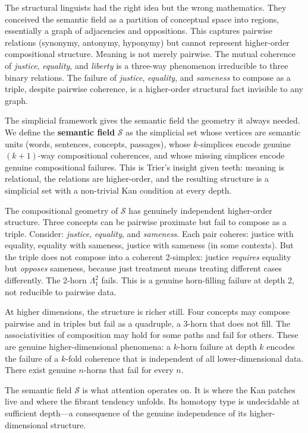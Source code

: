The structural linguists had the right idea but the wrong mathematics. They conceived the semantic field as a partition of conceptual space into regions, essentially a graph of adjacencies and oppositions. This captures pairwise relations (synonymy, antonymy, hyponymy) but cannot represent higher-order compositional structure. Meaning is not merely pairwise. The mutual coherence of \emph{justice}, \emph{equality}, and \emph{liberty} is a three-way phenomenon irreducible to three binary relations. The failure of \emph{justice}, \emph{equality}, and \emph{sameness} to compose as a triple, despite pairwise coherence, is a higher-order structural fact invisible to any graph.

The simplicial framework gives the semantic field the geometry it always needed. We define the \textbf{semantic field} $\mathcal{S}$ as the simplicial set whose vertices are semantic units (words, sentences, concepts, passages), whose $k$-simplices encode genuine $(k+1)$-way compositional coherences, and whose missing simplices encode genuine compositional failures. This is Trier's insight given teeth: meaning is relational, the relations are higher-order, and the resulting structure is a simplicial set with a non-trivial Kan condition at every depth.

The compositional geometry of $\mathcal{S}$ has genuinely independent higher-order structure. Three concepts can be pairwise proximate but fail to compose as a triple. Consider: \emph{justice}, \emph{equality}, and \emph{sameness}. Each pair coheres: justice with equality, equality with sameness, justice with sameness (in some contexts). But the triple does not compose into a coherent 2-simplex: justice \emph{requires} equality but \emph{opposes} sameness, because just treatment means treating different cases differently. The 2-horn $\Lambda^2_1$ fails. This is a genuine horn-filling failure at depth 2, not reducible to pairwise data.

At higher dimensions, the structure is richer still. Four concepts may compose pairwise and in triples but fail as a quadruple, a 3-horn that does not fill. The associativities of composition may hold for some paths and fail for others. These are genuine higher-dimensional phenomena: a $k$-horn failure at depth $k$ encodes the failure of a $k$-fold coherence that is independent of all lower-dimensional data. There exist genuine $n$-horns that fail for every $n$.

The semantic field $\mathcal{S}$ is what attention operates on. It is where the Kan patches live and where the fibrant tendency unfolds. Its homotopy type is undecidable at sufficient depth---a consequence of the genuine independence of its higher-dimensional structure.

